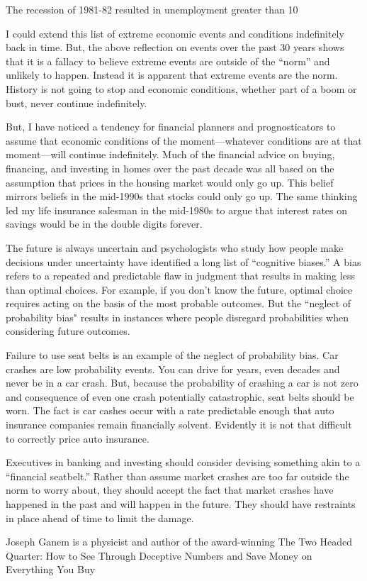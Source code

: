 The recession of 1981-82 resulted in unemployment greater than 10%

I could extend this list of extreme economic events and conditions indefinitely back in time. But, the above reflection on events over the past 30 years shows that it is a fallacy to believe extreme events are outside of the “norm” and unlikely to happen. Instead it is apparent that extreme events are the norm. History is not going to stop and economic conditions, whether part of a boom or bust, never continue indefinitely.

But, I have noticed a tendency for financial planners and prognosticators to assume that economic conditions of the moment—whatever conditions are at that moment—will continue indefinitely. Much of the financial advice on buying, financing, and investing in homes over the past decade was all based on the assumption that prices in the housing market would only go up. This belief mirrors beliefs in the mid-1990s that stocks could only go up. The same thinking led my life insurance salesman in the mid-1980s to argue that interest rates on savings would be in the double digits forever.

The future is always uncertain and psychologists who study how people make decisions under uncertainty have identified a long list of “cognitive biases.” A bias refers to a repeated and predictable flaw in judgment that results in making less than optimal choices. For example, if you don’t know the future, optimal choice requires acting on the basis of the most probable outcomes. But the “neglect of probability bias" results in instances where people disregard probabilities when considering future outcomes.

Failure to use seat belts is an example of the neglect of probability bias. Car crashes are low probability events. You can drive for years, even decades and never be in a car crash. But, because the probability of crashing a car is not zero and consequence of even one crash potentially catastrophic, seat belts should be worn. The fact is car cashes occur with a rate predictable enough that auto insurance companies remain financially solvent. Evidently it is not that difficult to correctly price auto insurance.

Executives in banking and investing should consider devising something akin to a “financial seatbelt.” Rather than assume market crashes are too far outside the norm to worry about, they should accept the fact that market crashes have happened in the past and will happen in the future. They should have restraints in place ahead of time to limit the damage.

Joseph Ganem is a physicist and author of the award-winning The Two Headed Quarter: How to See Through Deceptive Numbers and Save Money on Everything You Buy
